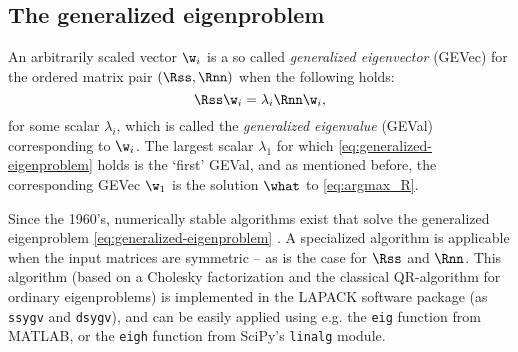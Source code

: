 \subsection{The generalized eigenproblem}
\label{sec:generalized-eigenproblem}

An arbitrarily scaled vector $\w_i$ is a so called \emph{generalized eigenvector} (GEVec) for the ordered matrix pair $(\Rss, \Rnn)$ when the following holds:
%
\begin{equation}
\label{eq:generalized-eigenproblem}
\Rss \w_i = \lambda_i \Rnn \w_i,
\end{equation}
%
for some scalar $\lambda_i$, which is called the \emph{generalized eigenvalue} (GEVal) corresponding to $\w_i$. The largest scalar $\lambda_1$ for which \cref{eq:generalized-eigenproblem} holds is the `first' GEVal, and as mentioned before, the corresponding GEVec $\w_1$ is the solution $\what$ to \cref{eq:argmax_R}.

Since the 1960's, numerically stable algorithms exist that solve the generalized eigenproblem \cref{eq:generalized-eigenproblem} \cite{Golub2013}. A specialized algorithm is applicable when the input matrices are symmetric -- as is the case for $\Rss$ and $\Rnn$. This algorithm (based on a Cholesky factorization and the classical QR-algorithm for ordinary eigenproblems) is implemented in the LAPACK software package (as \texttt{ssygv} and \texttt{dsygv}), and can be easily applied using e.g. the \texttt{eig} function from MATLAB, or the \texttt{eigh} function from SciPy's \texttt{linalg} module.
